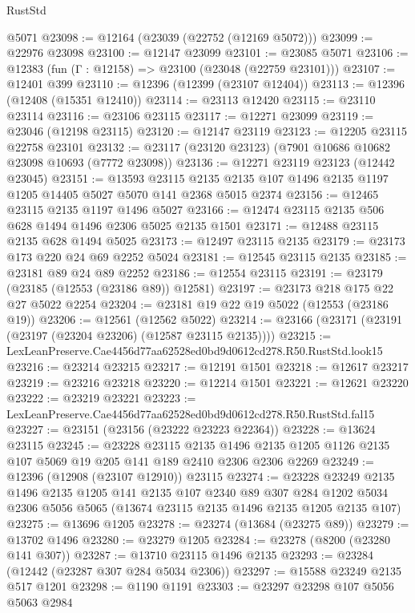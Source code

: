 \begin{lexlean}{RustStd}
\begin{coremodule}
    @5071
@23098 := @12164 (@23039 (@22752 (@12169 @5072)))
@23099 := @22976 @23098
@23100 := @12147 @23099
@23101 := @23085 @5071
@23106 := @12383 (fun (Γ : @12158) => @23100 (@23048 (@22759 @23101)))
@23107 := @12401 @399
@23110 := @12396 (@12399 (@23107 @12404))
@23113 := @12396 (@12408 (@15351 @12410))
@23114 := @23113 @12420
@23115 := @23110 @23114
@23116 := @23106 @23115
@23117 := @12271 @23099
@23119 := @23046 (@12198 @23115)
@23120 := @12147 @23119
@23123 := @12205 @23115 @22758 @23101
@23132 := @23117 (@23120 @23123) (@7901 @10686 @10682 @23098 @10693 (@7772 @23098))
@23136 := @12271 @23119 @23123 (@12442 @23045)
@23151 := @13593
    @23115
    @2135
    @2135
    @107
    @1496
    @2135
    @1197
    @1205
    @14405
    @5027
    @5070
    @141
    @2368
    @5015
    @2374
@23156 := @12465 @23115 @2135 @1197 @1496 @5027
@23166 := @12474 @23115 @2135 @506 @628 @1494 @1496 @2306 @5025 @2135 @1501
@23171 := @12488 @23115 @2135 @628 @1494 @5025
@23173 := @12497 @23115 @2135
@23179 := @23173 @173 @220 @24 @69 @2252 @5024
@23181 := @12545 @23115 @2135
@23185 := @23181 @89 @24 @89 @2252
@23186 := @12554 @23115
@23191 := @23179 (@23185 (@12553 (@23186 @89)) @12581)
@23197 := @23173 @218 @175 @22 @27 @5022 @2254
@23204 := @23181 @19 @22 @19 @5022 (@12553 (@23186 @19))
@23206 := @12561 (@12562 @5022)
@23214 := @23166 (@23171 (@23191 (@23197 (@23204 @23206) (@12587 @23115 @2135))))
@23215 := LexLeanPreserve.Cae4456d77aa62528ed0bd9d0612cd278.R50.RustStd.look15
@23216 := @23214 @23215
@23217 := @12191 @1501
@23218 := @12617 @23217
@23219 := @23216 @23218
@23220 := @12214 @1501
@23221 := @12621 @23220
@23222 := @23219 @23221
@23223 := LexLeanPreserve.Cae4456d77aa62528ed0bd9d0612cd278.R50.RustStd.fal15
@23227 := @23151 (@23156 (@23222 @23223 @22364))
@23228 := @13624 @23115
@23245 := @23228
    @23115
    @2135
    @1496
    @2135
    @1205
    @1126
    @2135
    @107
    @5069
    @19
    @205
    @141
    @189
    @2410
    @2306
    @2306
    @2269
@23249 := @12396 (@12908 (@23107 @12910)) @23115
@23274 := @23228
    @23249
    @2135
    @1496
    @2135
    @1205
    @141
    @2135
    @107
    @2340
    @89
    @307
    @284
    @1202
    @5034
    @2306
    @5056
    @5065
    (@13674 @23115 @2135 @1496 @2135 @1205 @2135 @107)
@23275 := @13696 @1205
@23278 := @23274 (@13684 (@23275 @89))
@23279 := @13702 @1496
@23280 := @23279 @1205
@23284 := @23278 (@8200 (@23280 @141 @307))
@23287 := @13710 @23115 @1496 @2135
@23293 := @23284 (@12442 (@23287 @307 @284 @5034 @2306))
@23297 := @15588 @23249 @2135 @517 @1201
@23298 := @1190 @1191
@23303 := @23297 @23298 @107 @5056 @5063 @2984

\end{coremodule}
\end{lexlean}
